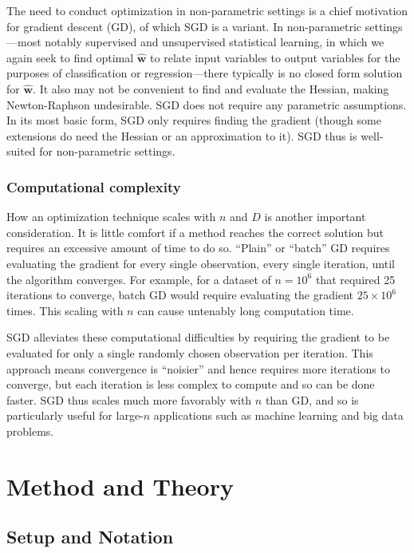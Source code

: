 \documentclass{article}
\begin{document}
The need to conduct optimization in non-parametric settings is a chief
motivation for gradient descent (GD), of which SGD is a variant. In
non-parametric settings---most notably supervised and unsupervised statistical
learning, in which we again seek to find optimal $\hat{\bm{w}}$ to relate input
variables to output variables for the purposes of classification or regression---there 
typically is no closed form solution for $\hat{\bm{w}}$. It
also may not be convenient to find and evaluate the Hessian, making
Newton-Raphson undesirable. SGD does not require any parametric assumptions. 
In its most basic form, SGD only requires finding the gradient (though some extensions
do need the Hessian or an approximation to it). 
SGD thus is well-suited for non-parametric settings.

\subsubsection{Computational complexity}

How an optimization technique scales with $n$ and $D$ is another important
consideration. It is little comfort if a method reaches the correct solution but
requires an excessive amount of time to do so. ``Plain'' or
``batch'' GD requires evaluating the gradient for every single observation,
every single iteration, until the algorithm converges. For example, for a
dataset of $n=10^6$ that required 25 iterations to converge, batch GD would require 
evaluating the gradient $25 \times 10^6$ times. This scaling with
$n$ can cause untenably long computation time.

SGD alleviates these computational difficulties by requiring the gradient to be
evaluated for only a single randomly chosen observation per iteration. This
approach means convergence is ``noisier'' and hence requires more iterations to
converge, but each iteration is less complex to compute and so can be done
faster. SGD thus scales much more favorably with $n$ than GD, and so is
particularly useful for large-$n$ applications such as machine learning
and big data problems.

\section{Method and Theory}

\subsection{Setup and Notation}
\end{document}
